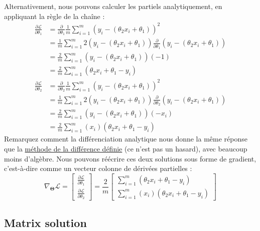 {\noindent Alternativement, nous pouvons calculer les partiels analytiquement, en appliquant la règle de la chaîne :
%
\begin{align}
\frac{\partial\mathcal{L}}{\partial \theta_1} & = \frac{\partial}{\partial \theta_1}\frac{1}{m}\sum_{i=1}^m(y_i - (\theta_2 x_i + \theta_1))^2 \\ & = \frac{1}{m}\sum_{i=1}^m 2 (y_i - (\theta_2 x_i + \theta_1))\frac{\partial}{\partial \theta_1}(y_i - (\theta_2 x_i + \theta_1)) \\ & = \frac{2}{m}\sum_{i=1}^m(y_i - (\theta_2 x_i + \theta_1))(-1) \\ & = \boxed{\frac{2}{m}\sum_{i=1}^m(\theta_2 x_i + \theta_1 - y_i)}
\end{align}
%
\begin{align}
\frac{\partial\mathcal{L}}{\partial \theta_2} & = \frac{\partial}{\partial \theta_2}\frac{1}{m}\sum_{i=1}^m(y_i - (\theta_2 x_i + \theta_1))^2 \\ & = \frac{1}{m}\sum_{i=1}^m 2(y_i - (\theta_2 x_i + \theta_1)) \frac{\partial}{\partial \theta_2}(y_i - (\theta_2 x_i + \theta_1)) \\ & = \frac{2}{m}\sum_{i=1}^m(y_i - (\theta_2 x_i + \theta_1))(-x_i) \\ & = \boxed{\frac{2}{m}\sum_{i=1}^m(x_i)(\theta_2 x_i + \theta_1 - y_i)}
\end{align}
%
Remarquez comment la différenciation analytique nous donne la même réponse que la \hyperref[sec:fdm]{méthode de la différence définie} (ce n'est pas un hasard), avec beaucoup moins d'algèbre. Nous pouvons réécrire ces deux solutions sous forme de gradient, c'est-à-dire comme un vecteur colonne de dérivées partielles :
%
\begin{equation}
\nabla_{\bm\Theta}\mathcal{L} =
\begin{bmatrix}
\frac{\partial\mathcal{L}}{\partial \theta_1} \\
\frac{\partial\mathcal{L}}{\partial \theta_2}
\end{bmatrix} = \frac{2}{m}
\begin{bmatrix}
\sum_{i=1}^m(\theta_2 x_i + \theta_1 - y_i) \\ \sum_{i=1}^m(x_i)(\theta_2 x_i + \theta_1 - y_i)
\end{bmatrix}
\end{equation}

\subsection{Matrix solution}\label{sec:linreg_matrix_sol}

}
